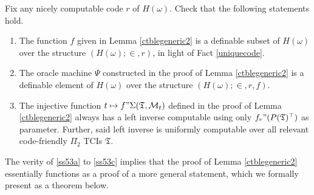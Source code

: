 \documentclass[12pt, twoside]{memoir}
\numberwithin{equation}{section}
\theoremstyle{definition}
\theoremstyle{remark}
\theoremstyle{definition}
\theoremstyle{definition}
\theoremstyle{definition}
\theoremstyle{remark}
\begin{document}
Fix any nicely computable code $r$ of $H(\omega)$. Check that the following statements hold.
\begin{enumerate}[label=(\Alph*)]
    \item\label{ss53a} The function $f$ given in Lemma \ref{ctblegeneric2} is a definable subset of $H(\omega)$ over the structure $(H(\omega); \in, r)$, in light of Fact \ref{uniquecode}.
    \item The oracle machine $\Psi$ constructed in the proof of Lemma \ref{ctblegeneric2} is a definable element of $H(\omega)$ over the structure $(H(\omega); \in, r, f)$.
    \item\label{ss53c} The injective function $t \mapsto f" \Sigma(\mathfrak{T}, \mathcal{M}_t)$ defined in the proof of Lemma \ref{ctblegeneric2} always has a left inverse computable using only $f_r" (P(\mathfrak{T})^{\top})$ as parameter. Further, said left inverse is uniformly computable over all relevant code-friendly $\Pi_2$ TCIs $\mathfrak{T}$.
\end{enumerate}
The verity of \ref{ss53a} to \ref{ss53c} implies that the proof of Lemma \ref{ctblegeneric2} essentially functions as a proof of a more general statement, which we formally present as a theorem below.
\end{document}
